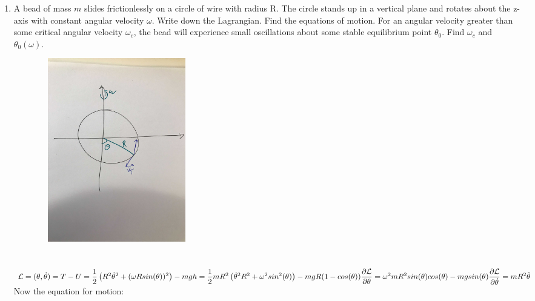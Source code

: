 \documentclass[fleqn]{article}
\begin{document}
\begin{enumerate}
    \pagebreak

    \item A bead of mass $m$ slides frictionlessly on a circle of wire with radius R.
    The circle stands up in a vertical plane and rotates about the z-axis
    with constant angular velocity $\omega$. Write down the Lagrangian. Find
    the equations of motion. For an angular velocity greater than some
    critical angular velocity $\omega_c$, the bead will experience small oscillations
    about some stable equilibrium point $\theta_0$. Find $\omega_c$ and $\theta_0(\omega)$.

      \textcolor{hwColor}{
        \includegraphics[height=8cm, width=9cm]{m.jpg}  \\
        \\
        \\
        $
          \mathcal{L}=(\theta, \dot{\theta})=T-U=\dfrac{1}{2} \left(R^2 \dot{\theta}^2+(\omega R sin(\theta))^2\right)-mgh \\
          \\
          =\dfrac{1}{2} mR^2 \left(\dot{\theta}^2 R^2+\omega^2 sin^2(\theta) \right)-mgR(1-cos(\theta)) \\
          \\
          \\
          \dfrac{\partial \mathcal{L}}{\partial \theta}=\omega^2 m R^2 sin(\theta) cos(\theta)-mg sin(\theta) \\
          \\
          \\
          \dfrac{\partial \mathcal{L}}{\partial \dot{\theta}}=mR^2 \ddot{\theta} \\ \\
        $
        Now the equation for motion: \\
}
\end{enumerate}
\end{document}
